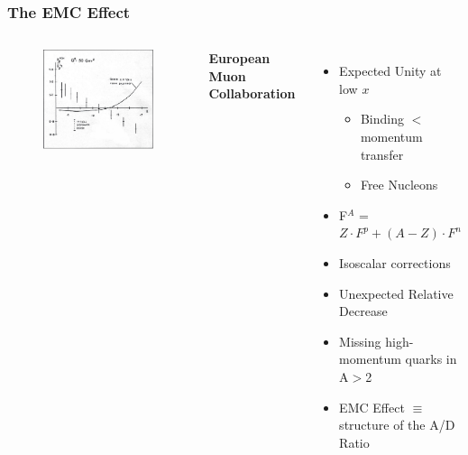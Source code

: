 \documentclass[12pt,usenames,dvipsnames]{beamer}
\begin{document}
\begin{frame}
\frametitle{The EMC Effect}
\begin{columns}[t]
	\vspace{-35pt}
	\begin{figure}
		\includegraphics[width =7cm]{../images/Thesis/EMC.png}
		\caption*{\cite{cc}}
	\end{figure}
	
	\vspace{-1.25cm}	\hspace{-20pt}\textbf{ European Muon Collaboration}
	\pause
	\begin{itemize}
		\item Expected Unity at low $x$ 
				\pause
		\begin{itemize}
			\item Binding $<$ momentum transfer
			\item Free Nucleons
		\end{itemize}

		\item F$^A$ = $Z \cdot F^p + (A-Z)\cdot F^n$  
		\pause
		\item Isoscalar corrections
		\item Unexpected Relative Decrease
		\item Missing high-momentum quarks in A$>$2
		\pause
		\item EMC Effect $\equiv$ structure of the A/D Ratio
	\end{itemize}
	
\end{columns}
\end{frame}
\end{document}
